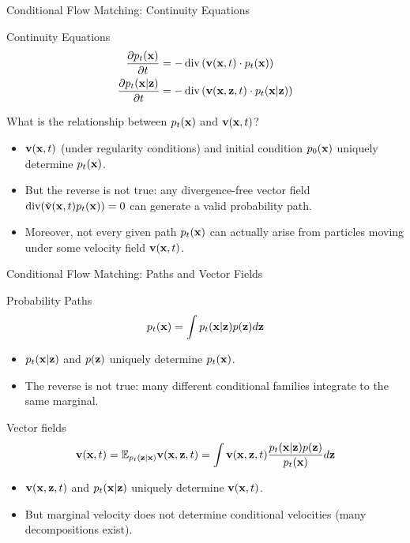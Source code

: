 \documentclass{beamer}
\begin{document}
\begin{frame}{Conditional Flow Matching: Continuity Equations}
	\begin{block}{Continuity Equations}
		\vspace{-0.5cm}
		\begin{align*}
			\frac{\partial p_t(\mathbf{x})}{\partial t} &= - \operatorname{div}\left(\mathbf{v}(\mathbf{x}, t) \cdot p_t(\mathbf{x})\right) \\
			\frac{\partial p_t(\mathbf{x} | \mathbf{z})}{\partial t} &= - \operatorname{div}\left(\mathbf{v}(\mathbf{x}, \mathbf{z}, t) \cdot p_t(\mathbf{x} | \mathbf{z})\right)
		\end{align*}
		\vspace{-0.5cm}
	\end{block}
	What is the relationship between $p_t(\mathbf{x})$ and $\mathbf{v}(\mathbf{x}, t)$?
	\eqpause
	\begin{itemize}
		\item $\mathbf{v}(\mathbf{x}, t)$ (under regularity conditions) and initial condition $p_0(\mathbf{x})$ uniquely determine $p_t(\mathbf{x})$.
		\eqpause
		\item But the reverse is not true: any divergence-free vector field $\operatorname{div}(\tilde{\mathbf{v}}(\mathbf{x}, t)p_t(\mathbf{x})) = 0$ can generate a valid probability path.
		\eqpause
		\item Moreover, not  every given path $p_t(\mathbf{x})$ can actually arise from particles moving under
		some velocity field $\mathbf{v}(\mathbf{x}, t)$.
	\end{itemize}
\end{frame}
\begin{frame}{Conditional Flow Matching: Paths and Vector Fields}
	\begin{block}{Probability Paths}
		\vspace{-0.3cm}
		\[
			p_t(\mathbf{x}) = \int p_t(\mathbf{x} | \mathbf{z}) p(\mathbf{z}) d \mathbf{z}
		\]
		\vspace{-0.5cm}
	\end{block}
	\eqpause
	\begin{itemize}
		\item $p_t(\mathbf{x} | \mathbf{z})$ and $p(\mathbf{z})$ uniquely determine $p_t(\mathbf{x})$.
		\item The reverse is not true: many different conditional families integrate to the same marginal.
	\end{itemize}
	\eqpause
	\begin{block}{Vector fields}
		\vspace{-0.3cm}
		\[
			\mathbf{v}(\mathbf{x}, t) = \mathbb{E}_{p_t(\mathbf{z} | \mathbf{x})} \mathbf{v}(\mathbf{x}, \mathbf{z}, t) = \int \mathbf{v}(\mathbf{x}, \mathbf{z}, t) \frac{p_t(\mathbf{x} | \mathbf{z}) p(\mathbf{z})}{p_t(\mathbf{x})} d \mathbf{z}
		\]
		\vspace{-0.5cm}
	\end{block}
	\eqpause
	\begin{itemize}
		\item $\mathbf{v}(\mathbf{x}, \mathbf{z}, t)$ and $p_t(\mathbf{x} | \mathbf{z})$ uniquely determine $\mathbf{v}(\mathbf{x}, t)$.
		\item But marginal velocity does not determine conditional velocities (many decompositions exist).
	\end{itemize}
\end{frame}
\end{document}
